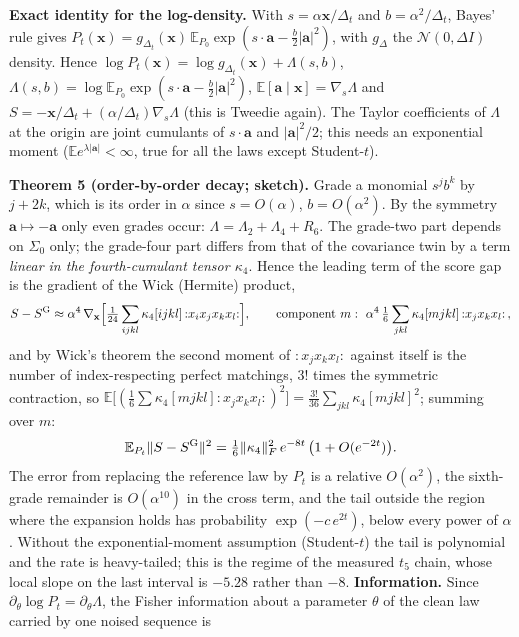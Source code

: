 \textbf{Exact identity for the log-density.} With $s=\alpha\mathbf x/\Delta_t$ and $b=\alpha^2/\Delta_t$, Bayes' rule gives $P_t(\mathbf x)=g_{\Delta_t}(\mathbf x)\,\mathbb E_{P_0}\exp(s\cdot\mathbf a-\tfrac b2|\mathbf a|^2)$, with $g_\Delta$ the $\mathcal N(0,\Delta I)$ density. Hence $\log P_t(\mathbf x)=\log g_{\Delta_t}(\mathbf x)+\Lambda(s,b)$,
$\Lambda(s,b)=\log\mathbb E_{P_0}\exp(s\cdot\mathbf a-\tfrac b2|\mathbf a|^2)$, $\mathbb E[\mathbf a\mid\mathbf x]=\nabla_s\Lambda$ and $S=-\mathbf x/\Delta_t+(\alpha/\Delta_t)\nabla_s\Lambda$ (this is Tweedie again). The Taylor coefficients of $\Lambda$ at the origin are joint cumulants of $s\cdot\mathbf a$ and $|\mathbf a|^2/2$; this needs an exponential moment
($\mathbb E e^{\lambda|\mathbf a|}<\infty$, true for all the laws except Student-$t$).

\textbf{Theorem 5 (order-by-order decay; sketch).} Grade a monomial $s^jb^k$ by $j+2k$, which is its order in $\alpha$ since $s=O(\alpha)$, $b=O(\alpha^2)$. By the symmetry $\mathbf a\mapsto-\mathbf a$ only even grades occur: $\Lambda=\Lambda_2+\Lambda_4+R_6$. The grade-two part depends on $\Sigma_0$ only; the grade-four part
differs from that of the covariance twin by a term \emph{linear in the fourth-cumulant tensor $\kappa_4$}. Hence the leading term of the score gap is the gradient of the Wick (Hermite) product,
\begin{equation}
S-S^{\rm G}\approx\alpha^4\,\nabla_{\mathbf x}\Big[\tfrac1{24}\sum_{ijkl}\kappa_4[ijkl]\,{:}x_ix_jx_kx_l{:}\Big],\qquad\text{component }m:\ \alpha^4\,\tfrac16\sum_{jkl}\kappa_4[mjkl]\,{:}x_jx_kx_l{:}\,,
\end{equation}
and by Wick's theorem the second moment of ${:}x_jx_kx_l{:}$ against itself is the number of index-respecting perfect matchings, $3!$ times the symmetric contraction, so $\mathbb E\big[(\tfrac16\sum\kappa_4[mjkl]{:}x_jx_kx_l{:})^2\big]=\tfrac{3!}{36}\sum_{jkl}\kappa_4[mjkl]^2$; summing over $m$:
\begin{equation}\label{eq:gap}
\mathbb E_{P_t}\|S-S^{\rm G}\|^2=\tfrac16\|\kappa_4\|_F^2\,e^{-8t}\,\big(1+O(e^{-2t})\big).
\end{equation}
The error from replacing the reference law by $P_t$ is a relative $O(\alpha^2)$, the sixth-grade remainder is $O(\alpha^{10})$ in the cross term, and the tail outside the region where the expansion holds has probability $\exp(-c\,e^{2t})$, below every power of $\alpha$. Without the exponential-moment assumption (Student-$t$) the tail is polynomial and the rate is heavy-tailed; this is the regime
of the measured $t_5$ chain, whose local slope on the last interval is $-5.28$ rather than $-8$. \textbf{Information.} Since $\partial_\theta\log P_t=\partial_\theta\Lambda$, the Fisher information about a parameter $\theta$ of the clean law carried by one noised sequence is
